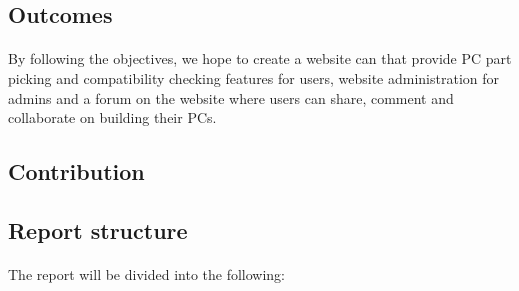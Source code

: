 \documentclass[11pt, a4paper]{article}
\begin{document}
\subsection{Outcomes}
\paragraph{} By following the objectives, we hope to create a website can that provide PC part picking and compatibility checking features for users, website administration for admins and a forum on the website where users can share, comment and collaborate on building their PCs.

\subsection{Contribution}

\subsection{Report structure}
\paragraph{} The report will be divided into the following:
\end{document}
